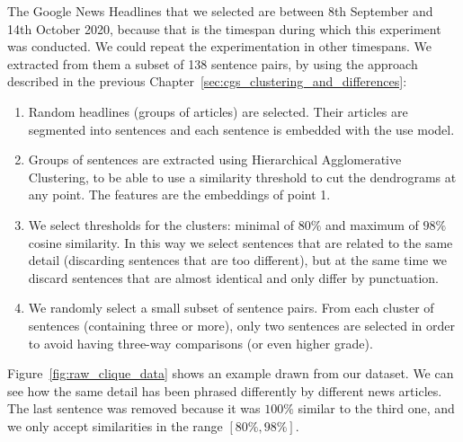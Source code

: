 The Google News Headlines that we selected are between 8th September and 14th October 2020,
because that is the timespan during which this experiment was conducted. We could repeat the experimentation in other timespans.
We extracted from them a subset of 138 sentence pairs, by using the approach described in the previous Chapter~\ref{sec:cgs_clustering_and_differences}:
\begin{enumerate}
    \item Random headlines (groups of articles) are selected. Their articles are segmented into sentences and each sentence is embedded with the \acrshort{use} model.
    \item Groups of sentences are extracted using Hierarchical Agglomerative Clustering, to be able to use a similarity threshold to cut the dendrograms at any point. The features are the embeddings of point 1.
    \item We select thresholds for the clusters: minimal of $80\%$ and maximum of $98\%$ cosine similarity. In this way we select sentences that are related to the same detail (discarding sentences that are too different), but at the same time we discard sentences that are almost identical and only differ by punctuation.
    \item We randomly select a small subset of sentence pairs. From each cluster of sentences (containing three or more), only two sentences are selected in order to avoid having three-way comparisons (or even higher grade).
\end{enumerate}

Figure~\ref{fig:raw_clique_data} shows an example drawn from our dataset. We can see how the same detail has been phrased differently by different news articles.
The last sentence was removed because it was $100\%$ similar to the third one, and we only accept similarities in the range $[80\%,98\%]$.

